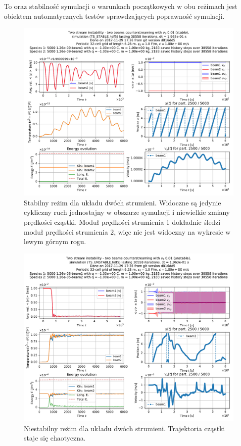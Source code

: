 To oraz stabilność symulacji o warunkach początkowych w obu reżimach jest
obiektem automatycznych testów sprawdzających poprawność symulacji.

\begin{figure}[h!]
  \includegraphics[width=\textwidth]{Images/TS_STABLE}
  \caption{Stabilny reżim dla układu dwóch strumieni. Widoczne są jedynie
  cykliczny ruch jednostajny w obszarze symulacji i niewielkie zmiany prędkości
cząstki. Moduł prędkości strumienia 1 dokładnie śledzi moduł prędkości
strumienia 2, więc nie jest widoczny na wykresie w lewym górnym
rogu.\label{fig:twostream-stable}}
\end{figure}

\begin{figure}[h!]
  \includegraphics[width=\textwidth]{Images/TS_UNSTABLE}
  \caption{Niestabilny reżim dla układu dwóch strumieni. Trajektoria cząstki staje się chaotyczna.\label{fig:twostream-unstable}}
\end{figure}

